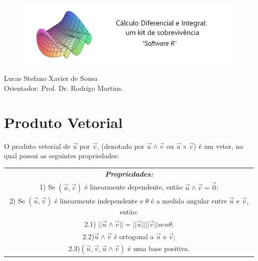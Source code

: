\documentclass[12pt,a4paper]{article}
\begin{document}
	
\begin{figure}[htb]
	\includegraphics[scale=0.6]{logo.jpg}
\end{figure}

	
	
	\begin{center}Lucas Stefano Xavier de Sousa \\ Orientador: Prof. Dr. Rodrigo Martins.\end{center}
	
	
	\vspace{2cm}
	
	\section*{Produto Vetorial}
	
	O produto vetorial de $\vec{u}$ por $\vec{v}$, (denotado por $\vec{u}\wedge\vec{v}$ ou $\vec{u}\times\vec{v} $) é um vetor, no qual possui as seguintes propriedades:\\
	
	\begin{center}
		\vspace{0.2cm}
		\begin{tabular}{|c|}
			\hline
			\textit{\textbf{Propriedades:}} \\
			1) Se $(\vec{u}, \vec{v})$ é linearmente dependente, então $\vec{u}\wedge\vec{v}=\vec{0}$;\\
			2) Se $(\vec{u}, \vec{v})$ é linearmente independente e $\theta$ é a medida angular entre $\vec{u}$ e $\vec{v}$, então:\\
			
			2.1) $||\vec{u}\wedge\vec{v}|| = ||\vec{u}|| ||\vec{v}|| sen\theta $; \\
			2.2)$\vec{u}\wedge\vec{v}$ é ortogonal a $\vec{u}$ e $\vec{v}$;\\
			
			2.3)$(\vec{u}, \vec{v}, \vec{u}\wedge\vec{v} )$ é uma base positiva.	\\
			\hline
		\end{tabular}
	\end{center}
	
\end{document}
